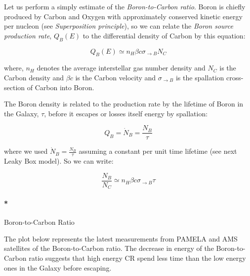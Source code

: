 \documentclass[
  letterpaper,
  DIV=11,
  numbers=noendperiod]{scrreprt}
\let\oldparagraph\paragraph
\renewcommand{\paragraph}[1]{\oldparagraph{#1}\mbox{}}
\begin{document}
Let us perform a simply estimate of the \emph{Boron-to-Carbon ratio}.
Boron is chiefly produced by Carbon and Oxygen with approximately
conserved kinetic energy per nucleon (see \emph{Superposition
principle}), so we can relate the \emph{Boron source production rate},
\(Q_B(E)\) to the differential density of Carbon by this equation:

\[Q_B(E) \simeq n_{H} \beta c \sigma_{\rightarrow B} N_C\]

where, \(n_H\) denotes the average interstellar gas number density and
\(N_C\) is the Carbon density and \(\beta c\) is the Carbon velocity and
\(\sigma_{\rightarrow B}\) is the spallation cross-section of Carbon
into Boron.

The Boron density is related to the production rate by the lifetime of
Boron in the Galaxy, \(\tau\), before it escapes or losses itself energy
by spallation:

\[Q_B = \dot{N}_B = \frac{N_B}{\tau}\]

where we used \(\dot{N}_B = \frac{N_B}{\tau}\) assuming a constant per
unit time lifetime (see next Leaky Box model). So we can write:

\[\frac{N_B}{N_C} \simeq n_{H} \beta c \sigma_{\rightarrow B}\tau\]

\paragraph*{Boron-to-Carbon Ratio}\label{boron-to-carbon-ratio}

The plot below represents the latest measurements from PAMELA and AMS
satellites of the Boron-to-Carbon ratio. The decrease in energy of the
Boron-to-Carbon ratio suggests that high energy CR spend less time than
the low energy ones in the Galaxy before escaping.
\end{document}
